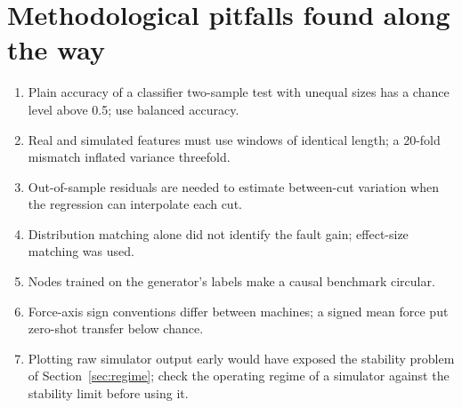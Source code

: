 \documentclass[11pt]{article}
\begin{document}
\section{Methodological pitfalls found along the way}
\begin{enumerate}
\item Plain accuracy of a classifier two-sample test with unequal sizes has a chance level above 0.5; use balanced accuracy.
\item Real and simulated features must use windows of identical length; a 20-fold mismatch inflated variance threefold.
\item Out-of-sample residuals are needed to estimate between-cut variation when the regression can interpolate each cut.
\item Distribution matching alone did not identify the fault gain; effect-size matching was used.
\item Nodes trained on the generator's labels make a causal benchmark circular.
\item Force-axis sign conventions differ between machines; a signed mean force put zero-shot transfer below chance.
\item Plotting raw simulator output early would have exposed the stability problem of Section~\ref{sec:regime}; check the operating regime of a simulator against the stability limit before using it.
\end{enumerate}
\end{document}
